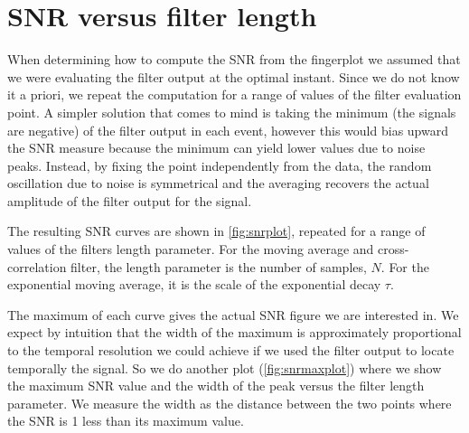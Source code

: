 \section{SNR versus filter length}

When determining how to compute the SNR from the fingerplot we assumed that we
were evaluating the filter output at the optimal instant. Since we do not know
it a priori, we repeat the computation for a range of values of the filter
evaluation point. A simpler solution that comes to mind is taking the minimum
(the signals are negative) of the filter output in each event, however this
would bias upward the SNR measure because the minimum can yield lower values
due to noise peaks. Instead, by fixing the point independently from the data,
the random oscillation due to noise is symmetrical and the averaging recovers
the actual amplitude of the filter output for the signal.

The resulting SNR curves are shown in \autoref{fig:snrplot}, repeated for a
range of values of the filters length parameter. For the moving average and
cross-correlation filter, the length parameter is the number of samples, $N$.
For the exponential moving average, it is the scale of the exponential decay
$\tau$.

\begin{figure}
    

\end{figure}

The maximum of each curve gives the actual SNR figure we are interested in. We
expect by intuition that the width of the maximum is approximately proportional
to the temporal resolution we could achieve if we used the filter output to
locate temporally the signal. So we do another plot
(\autoref{fig:snrmaxplot}) where we show the maximum SNR value and the width
of the peak versus the filter length parameter. We measure the width as the
distance between the two points where the SNR is 1 less than its maximum value.


\begin{figure}
    

\end{figure}

